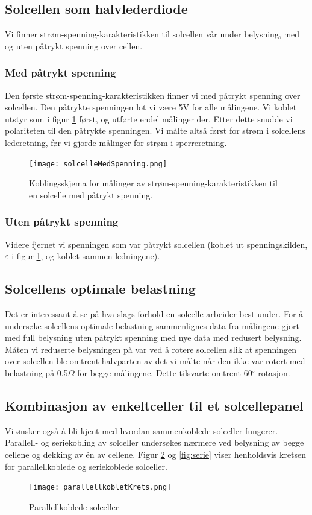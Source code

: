 \documentclass[a4paper,11pt, twocolumn]{article}
\begin{document}
\subsection{Solcellen som halvlederdiode}
Vi finner strøm-spenning-karakteristikken til solcellen vår under belysning, med og uten påtrykt spenning over cellen.
\subsubsection{Med påtrykt spenning}
Den første strøm-spenning-karakteristikken finner vi med påtrykt spenning over solcellen. Den påtrykte spenningen lot vi være 5V for alle målingene. Vi koblet utstyr som i figur \ref{fig:solcelleMedSpenning} først, og utførte endel målinger der. Etter dette snudde vi polariteten til den påtrykte spenningen. Vi målte altså først for strøm i solcellens lederetning, før vi gjorde målinger for strøm i sperreretning.

\begin{figure}[!ht]
	\texttt{[image: solcelleMedSpenning.png]}
	\caption{Koblingsskjema for målinger av strøm-spenning-karakteristikken til en solcelle med påtrykt spenning.}
	\label{fig:solcelleMedSpenning}
\end{figure}

\subsubsection{Uten påtrykt spenning}
Videre fjernet vi spenningen som var påtrykt solcellen (koblet ut spenningskilden, $\varepsilon$ i figur \ref{fig:solcelleMedSpenning}, og koblet sammen ledningene).

\subsection{Solcellens optimale belastning}
Det er interessant å se på hva slags forhold en solcelle arbeider best under.
For å undersøke solcellens optimale belastning sammenlignes data fra målingene gjort med full belysning uten påtrykt spenning med nye data med redusert belysning. Måten vi reduserte belysningen på var ved å rotere solcellen slik at spenningen over solcellen ble omtrent halvparten av det vi målte når den ikke var rotert med belastning på 0.5$\Omega$ for begge målingene. Dette tilsvarte omtrent 60$^\circ$ rotasjon.
\subsection{Kombinasjon av enkeltceller til et solcellepanel}
Vi ønsker også å bli kjent med hvordan sammenkoblede solceller fungerer. Parallell- og seriekobling av solceller undersøkes nærmere ved belysning av begge cellene og dekking av \'en av cellene. Figur \ref{fig:parallell} og \ref{fig:serie} viser henholdsvis kretsen for parallellkoblede og seriekoblede solceller.
\begin{figure}[!ht]
	\texttt{[image: parallellkobletKrets.png]}
	\caption{Parallellkoblede solceller}
	\label{fig:parallell}
\end{figure}
\end{document}
